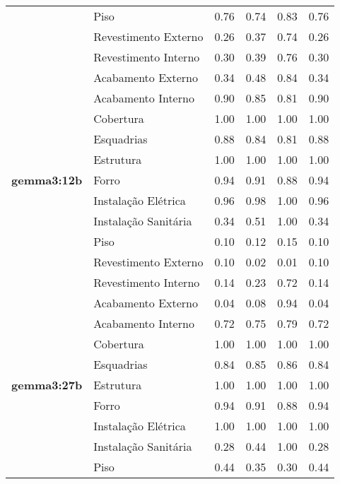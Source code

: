 \begin{table}[htbp]
\begin{tabular}{llcccc}
     & \multirow{1}{*}{Piso} & 0.76 & 0.74 & 0.83 & 0.76 \\
     & \multirow{1}{*}{Revestimento Externo} & 0.26 & 0.37 & 0.74 & 0.26 \\
     & \multirow{1}{*}{Revestimento Interno} & 0.30 & 0.39 & 0.76 & 0.30 \\
    \midrule
    \multirow{11}{*}{\textbf{gemma3:12b}} & \multirow{1}{*}{Acabamento Externo} & 0.34 & 0.48 & 0.84 & 0.34 \\
     & \multirow{1}{*}{Acabamento Interno} & 0.90 & 0.85 & 0.81 & 0.90 \\
     & \multirow{1}{*}{Cobertura} & 1.00 & 1.00 & 1.00 & 1.00 \\
     & \multirow{1}{*}{Esquadrias} & 0.88 & 0.84 & 0.81 & 0.88 \\
     & \multirow{1}{*}{Estrutura} & 1.00 & 1.00 & 1.00 & 1.00 \\
     & \multirow{1}{*}{Forro} & 0.94 & 0.91 & 0.88 & 0.94 \\
     & \multirow{1}{*}{Instalação Elétrica} & 0.96 & 0.98 & 1.00 & 0.96 \\
     & \multirow{1}{*}{Instalação Sanitária} & 0.34 & 0.51 & 1.00 & 0.34 \\
     & \multirow{1}{*}{Piso} & 0.10 & 0.12 & 0.15 & 0.10 \\
     & \multirow{1}{*}{Revestimento Externo} & 0.10 & 0.02 & 0.01 & 0.10 \\
     & \multirow{1}{*}{Revestimento Interno} & 0.14 & 0.23 & 0.72 & 0.14 \\
    \midrule
    \multirow{11}{*}{\textbf{gemma3:27b}} & \multirow{1}{*}{Acabamento Externo} & 0.04 & 0.08 & 0.94 & 0.04 \\
     & \multirow{1}{*}{Acabamento Interno} & 0.72 & 0.75 & 0.79 & 0.72 \\
     & \multirow{1}{*}{Cobertura} & 1.00 & 1.00 & 1.00 & 1.00 \\
     & \multirow{1}{*}{Esquadrias} & 0.84 & 0.85 & 0.86 & 0.84 \\
     & \multirow{1}{*}{Estrutura} & 1.00 & 1.00 & 1.00 & 1.00 \\
     & \multirow{1}{*}{Forro} & 0.94 & 0.91 & 0.88 & 0.94 \\
     & \multirow{1}{*}{Instalação Elétrica} & 1.00 & 1.00 & 1.00 & 1.00 \\
     & \multirow{1}{*}{Instalação Sanitária} & 0.28 & 0.44 & 1.00 & 0.28 \\
     & \multirow{1}{*}{Piso} & 0.44 & 0.35 & 0.30 & 0.44 \\

\end{tabular}
\end{table}
